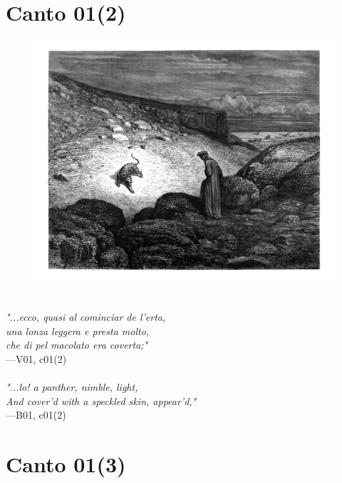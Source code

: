 \documentclass[../Dore_vision.tex]{subfiles}
\begin{document}
\newpage

\section{Canto 01(2)}

\begin{figure}[ht]
\centering
\includegraphics[height=\figsize]{illustrations/book_1/V01, c01(2).jpg}
\end{figure}

\begin{center}
\begin{minipage}{0.8\linewidth}
\textit{\\
"...ecco, quasi al cominciar de l’erta,\\una lonza leggera e presta molto,\\che di pel macolato era coverta;"} \\
—V01, c01(2) \\~\\
\textit{"...lo! a panther, nimble, light,\\And cover'd with a speckled skin, appear'd,"} \\
—B01, c01(2)
\end{minipage}
\end{center}

\newpage

\section{Canto 01(3)}
\end{document}
